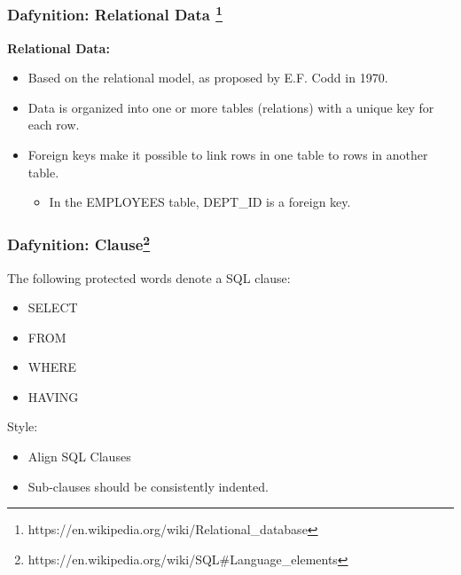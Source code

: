 \documentclass{beamer}
\begin{document}
\begin{frame} %
  \frametitle{Dafynition: Relational Data \footnote{https://en.wikipedia.org/wiki/Relational\_database}}

  \textbf{Relational Data:}
  \begin{itemize}
  \item Based on the relational model, as proposed by E.F. Codd in
    1970.
  \item Data is organized into one or more tables (relations) with a
    unique key for each row.
  \item Foreign keys make it possible to link rows in one table to
    rows in another table.
    \begin{itemize}
    \item In the EMPLOYEES table, DEPT\_ID is a foreign key.
    \end{itemize}
  \end{itemize}

\end{frame}  

\begin{frame} %
  \frametitle{Dafynition: Clause\footnote{https://en.wikipedia.org/wiki/SQL\#Language\_elements}}
  
  The following protected words denote a SQL clause:

  \smallskip
  \begin{itemize}
  \item SELECT
  \item FROM
  \item WHERE
  \item HAVING
  \end{itemize}
  
  \bigskip
  \pause
  Style:
  \begin{itemize}
  \item Align SQL Clauses
  \item Sub-clauses should be consistently indented.
  \end{itemize}
  
\end{frame}  
\end{document}
